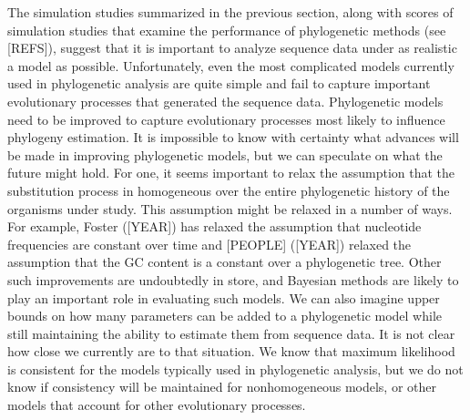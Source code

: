 \documentclass{svmult}
\begin{document}
The simulation studies summarized in the previous section, along with scores of simulation studies that examine the performance of phylogenetic methods
(see [REFS]), suggest that it
is important to analyze sequence data under as realistic a model as possible. Unfortunately, even the most complicated models currently used in phylogenetic analysis 
are quite simple and fail to capture important evolutionary processes that generated the sequence data. Phylogenetic models need to be improved to
capture evolutionary processes most likely to influence phylogeny estimation. It is impossible to know with certainty what advances will be made in improving
phylogenetic models, but we can speculate on what the future might hold. For one, it seems important to
relax the assumption that the substitution process in homogeneous over the entire phylogenetic history of the organisms under study. This assumption might
be relaxed in a number of ways. For example, Foster ([YEAR]) has relaxed the assumption that nucleotide frequencies are constant over time and [PEOPLE]
([YEAR]) relaxed the assumption that the GC content is a constant over a phylogenetic tree. Other such improvements are undoubtedly in store, and Bayesian
methods are likely to play an important role in evaluating such models.
We can also imagine upper bounds on how many
parameters can be added to a phylogenetic model while still maintaining the ability to estimate them from sequence data. It is not clear how close we currently
are to that situation. We know that maximum likelihood is consistent for the models typically used in phylogenetic analysis, but we do not know if consistency
will be maintained for nonhomogeneous models, or other models that account for other evolutionary processes.
\end{document}
